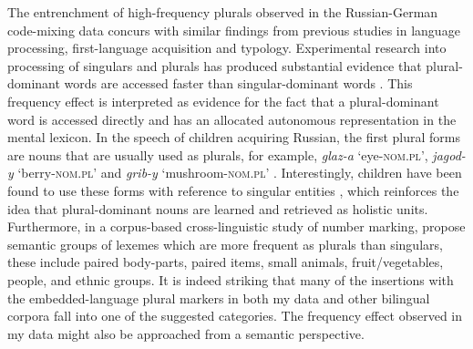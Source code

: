 The entrenchment of high-frequency plurals observed in the Russian-German code-mixing data concurs with similar findings from previous studies in language processing, first-language acquisition and typology. Experimental research into processing of singulars and plurals has produced substantial evidence that plural-dominant words are accessed faster than singular-dominant words \citep{new-etal-2004,sereno-jongman-1997,baayen-dijkstra-schreuder}. This frequency effect is interpreted as evidence for the fact that a plural-dominant word is accessed directly and has an allocated autonomous representation in the mental lexicon. In the speech of children acquiring Russian, the first plural forms are nouns that are usually used as plurals, for example, \textit{glaz-a} `eye-\textsc{nom.pl}', \textit{jagod-y} `berry-\textsc{nom.pl}' and \textit{grib-y} `mushroom-\textsc{nom.pl}' \citep[198]{gagarina-voeikova}. Interestingly, children have been found to use these forms with reference to singular entities \citep[91]{ceitlin}, which reinforces the idea that plural-dominant nouns are learned and retrieved as holistic units. Furthermore, in a corpus-based cross-linguistic study of number marking, \citet{haspelmath-karjus} propose semantic groups of lexemes which are more frequent as plurals than singulars, these include paired body-parts, paired items, small animals, fruit/vegetables, people, and ethnic groups. It is indeed striking that many of the insertions with the embedded-language plural markers in both my data and other bilingual corpora fall into one of the suggested categories. The frequency effect observed in my data might also be approached from a semantic perspective.

